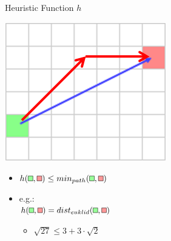 \documentclass{presentation}
\begin{document}
\begin{frame}{Heuristic Function $h$}
	\begin{minipage}{0.3\textwidth}
		\includegraphics[width=\textwidth]{figures/heuristic.png}
	\end{minipage}%
	\hfill%
	\begin{minipage}{0.6\textwidth}
		\begin{itemize}
		\item $h(\tikz{\path[draw=black,fill=white!60!green] (0,0) rectangle (2mm,2mm);},\tikz{\path[draw=black,fill=white!60!red] (0,0) rectangle (2mm,2mm);})\leq min_{path}(\tikz{\path[draw=black,fill=white!60!green] (0,0) rectangle (2mm,2mm);},\tikz{\path[draw=black,fill=white!60!red] (0,0) rectangle (2mm,2mm);})$
		\pause
		\item e.g.:\\ $h(\tikz{\path[draw=black,fill=white!60!green] (0,0) rectangle (2mm,2mm);},\tikz{\path[draw=black,fill=white!60!red] (0,0) rectangle (2mm,2mm);}) = dist_{euklid}(\tikz{\path[draw=black,fill=white!60!green] (0,0) rectangle (2mm,2mm);},\tikz{\path[draw=black,fill=white!60!red] (0,0) rectangle (2mm,2mm);})$
		\begin{itemize}
			\item $\sqrt{27} \leq 3+3\cdot\sqrt{2}$
		\end{itemize}
		\end{itemize}
	\end{minipage}
\end{frame}
\end{document}
